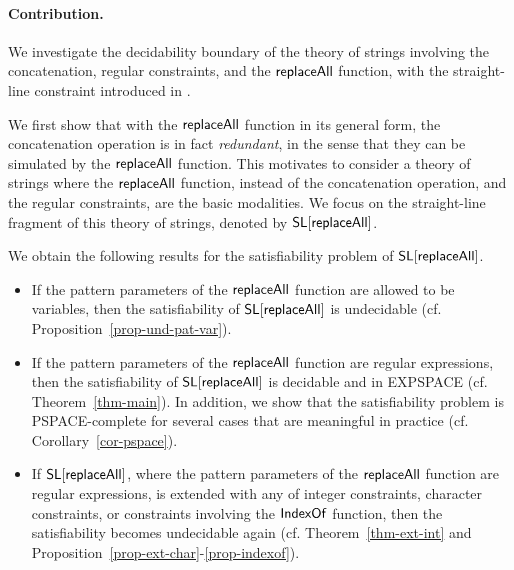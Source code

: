 \paragraph{Contribution.} We investigate the decidability boundary of the theory of strings involving the concatenation, regular constraints, and the $\mathsf{replaceAll}$ function, with the straight-line constraint introduced in \cite{LB16}. 

We first show that with the $\mathsf{replaceAll}$ function in its general form, the concatenation operation is in fact \emph{redundant}, in the sense that they can be simulated by the $\mathsf{replaceAll}$ function. This motivates to consider a theory of strings where the $\mathsf{replaceAll}$ function, instead of the concatenation operation, and the regular constraints, are the basic modalities. We focus on the straight-line fragment of this theory of strings, denoted by $\mathsf{SL}[\mathsf{replaceAll}]$.

We obtain the following results for the satisfiability problem of $\mathsf{SL}[\mathsf{replaceAll}]$.
\begin{itemize}
\item If the pattern parameters of the $\mathsf{replaceAll}$ function are allowed to be variables, then the satisfiability of $\mathsf{SL}[\mathsf{replaceAll}]$ is undecidable (cf. Proposition~\ref{prop-und-pat-var}).
%
\item If the pattern parameters of the $\mathsf{replaceAll}$ function are regular expressions, then the satisfiability of $\mathsf{SL}[\mathsf{replaceAll}]$ is decidable and in EXPSPACE (cf. Theorem~\ref{thm-main}). In addition, we show that the satisfiability problem is PSPACE-complete for several cases that are meaningful in practice (cf. Corollary~\ref{cor-pspace}).
%
\item If $\mathsf{SL}[\mathsf{replaceAll}]$, where the pattern parameters of the $\mathsf{replaceAll}$ function are regular expressions, is extended with any of integer constraints, character constraints, or constraints involving the $\mathsf{IndexOf}$ function, then the satisfiability becomes undecidable again (cf. Theorem~\ref{thm-ext-int} and  Proposition~\ref{prop-ext-char}-\ref{prop-indexof}).
\end{itemize}

